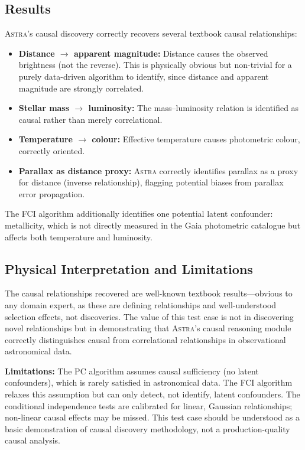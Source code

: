 \documentclass[usenatbib]{rasti}
\newcommand{\astra}{\textsc{Astra}\xspace}
\newcommand{\pc}{PC\xspace}
\newcommand{\fci}{FCI\xspace}
\begin{document}
\subsection{Results}
\label{sec:tc4:results}

\astra's causal discovery correctly recovers several textbook causal relationships:
\begin{itemize}
  \item \textbf{Distance $\rightarrow$ apparent magnitude:} Distance causes the observed brightness (not the reverse). This is physically obvious but non-trivial for a purely data-driven algorithm to identify, since distance and apparent magnitude are strongly correlated.
  \item \textbf{Stellar mass $\rightarrow$ luminosity:} The mass--luminosity relation is identified as causal rather than merely correlational.
  \item \textbf{Temperature $\rightarrow$ colour:} Effective temperature causes photometric colour, correctly oriented.
  \item \textbf{Parallax as distance proxy:} \astra correctly identifies parallax as a proxy for distance (inverse relationship), flagging potential biases from parallax error propagation.
\end{itemize}

The \fci algorithm additionally identifies one potential latent confounder: metallicity, which is not directly measured in the Gaia photometric catalogue but affects both temperature and luminosity.

\subsection{Physical Interpretation and Limitations}
\label{sec:tc4:interpretation}

The causal relationships recovered are well-known textbook results---obvious to any domain expert, as these are defining relationships and well-understood selection effects, not discoveries.
The value of this test case is not in discovering novel relationships but in demonstrating that \astra's causal reasoning module correctly distinguishes causal from correlational relationships in observational astronomical data.

\textbf{Limitations:}
The \pc algorithm assumes causal sufficiency (no latent confounders), which is rarely satisfied in astronomical data.
The \fci algorithm relaxes this assumption but can only detect, not identify, latent confounders.
The conditional independence tests are calibrated for linear, Gaussian relationships; non-linear causal effects may be missed.
This test case should be understood as a basic demonstration of causal discovery methodology, not a production-quality causal analysis.
\end{document}
